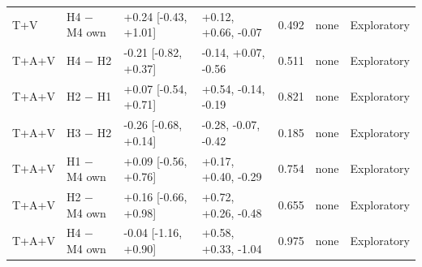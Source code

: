 {\begin{longtable}{lllllll}
T+V & H4 $-$ M4 own & +0.24 [-0.43, +1.01] & +0.12, +0.66, -0.07 & 0.492 & none & Exploratory \\
T+A+V & H4 $-$ H2 & -0.21 [-0.82, +0.37] & -0.14, +0.07, -0.56 & 0.511 & none & Exploratory \\
T+A+V & H2 $-$ H1 & +0.07 [-0.54, +0.71] & +0.54, -0.14, -0.19 & 0.821 & none & Exploratory \\
T+A+V & H3 $-$ H2 & -0.26 [-0.68, +0.14] & -0.28, -0.07, -0.42 & 0.185 & none & Exploratory \\
T+A+V & H1 $-$ M4 own & +0.09 [-0.56, +0.76] & +0.17, +0.40, -0.29 & 0.754 & none & Exploratory \\
T+A+V & H2 $-$ M4 own & +0.16 [-0.66, +0.98] & +0.72, +0.26, -0.48 & 0.655 & none & Exploratory \\
T+A+V & H4 $-$ M4 own & -0.04 [-1.16, +0.90] & +0.58, +0.33, -1.04 & 0.975 & none & Exploratory \\
\end{longtable}
\par{}
}
